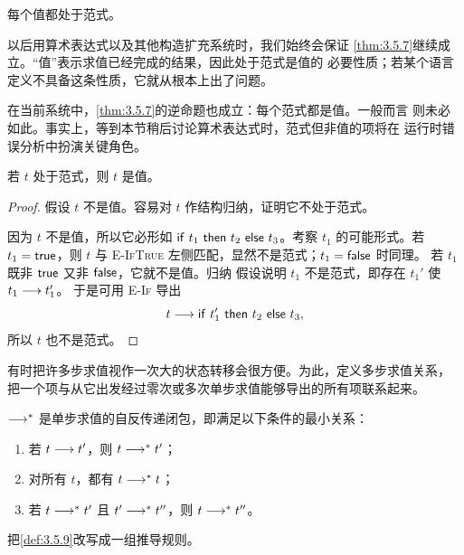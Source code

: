 \begin{theorem}
\label{thm:3.5.7}
每个值都处于范式。
\end{theorem}

以后用算术表达式以及其他构造扩充系统时，我们始终会保证
\cref{thm:3.5.7}继续成立。“值”表示求值已经完成的结果，因此处于范式是值的
必要性质；若某个语言定义不具备这条性质，它就从根本上出了问题。

在当前系统中，\cref{thm:3.5.7}的逆命题也成立：每个范式都是值。一般而言
则未必如此。事实上，等到本节稍后讨论算术表达式时，范式但非值的项将在
运行时错误分析中扮演关键角色。

\begin{theorem}
\label{thm:3.5.8}
若 \(t\) 处于范式，则 \(t\) 是值。
\end{theorem}

\begin{proof}
假设 \(t\) 不是值。容易对 \(t\) 作结构归纳，证明它不处于范式。

因为 \(t\) 不是值，所以它必形如 \(\mathsf{if}\ t_1\ \mathsf{then}\ t_2\ \mathsf{else}\ t_3\)。考察
\(t_1\) 的可能形式。若 \(t_1=\mathsf{true}\)，则 \(t\) 与
\textsc{E-IfTrue} 左侧匹配，显然不是范式；\(t_1=\mathsf{false}\) 时同理。
若 \(t_1\) 既非 \(\mathsf{true}\) 又非 \(\mathsf{false}\)，它就不是值。归纳
假设说明 \(t_1\) 不是范式，即存在 \(t_1'\) 使 \(t_1\mathrel{\longrightarrow} t_1'\)。
于是可用 \textsc{E-If} 导出
\[
 t\mathrel{\longrightarrow}\mathsf{if}\ t_1'\ \mathsf{then}\ t_2\ \mathsf{else}\ t_3,
\]
所以 \(t\) 也不是范式。
\end{proof}

有时把许多步求值视作一次大的状态转移会很方便。为此，定义多步求值关系，
把一个项与从它出发经过零次或多次单步求值能够导出的所有项联系起来。

\begin{definition}
\label{def:3.5.9}
 \(\mathrel{\longrightarrow^{*}}\)
是单步求值的自反传递闭包，即满足以下条件的最小关系：
\begin{enumerate}
  \item 若 \(t\mathrel{\longrightarrow} t'\)，则 \(t\mathrel{\longrightarrow^{*}} t'\)；
  \item 对所有 \(t\)，都有 \(t\mathrel{\longrightarrow^{*}} t\)；
  \item 若 \(t\mathrel{\longrightarrow^{*}} t'\) 且 \(t'\mathrel{\longrightarrow^{*}} t''\)，则
    \(t\mathrel{\longrightarrow^{*}} t''\)。
\end{enumerate}
\end{definition}

\begin{exercise}[\(\star\)]
\label{ex:3.5.10}
把\cref{def:3.5.9}改写成一组推导规则。
\end{exercise}

